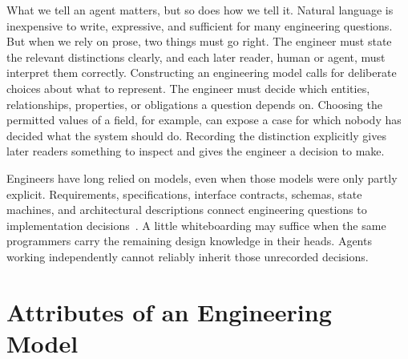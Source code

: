 
What we tell an agent matters, but so does how we tell it. Natural language is inexpensive to write, expressive, and sufficient for many engineering questions. But when we rely on prose, two things must go right. The engineer must state the relevant distinctions clearly, and each later reader, human or agent, must interpret them correctly. Constructing an engineering model calls for deliberate choices about what to represent. The engineer must decide which entities, relationships, properties, or obligations a question depends on. Choosing the permitted values of a field, for example, can expose a case for which nobody has decided what the system should do. Recording the distinction explicitly gives later readers something to inspect and gives the engineer a decision to make.


Engineers have long relied on models, even when those models were only partly explicit. Requirements, specifications, interface contracts, schemas, state machines, and architectural descriptions connect engineering questions to implementation decisions~\citep{vanlamsweerde2009re,isoiec42010}. A little whiteboarding may suffice when the same programmers carry the remaining design knowledge in their heads. Agents working independently cannot reliably inherit those unrecorded decisions.

\section{Attributes of an Engineering Model}\label{heading:choosing-what-to-model}



